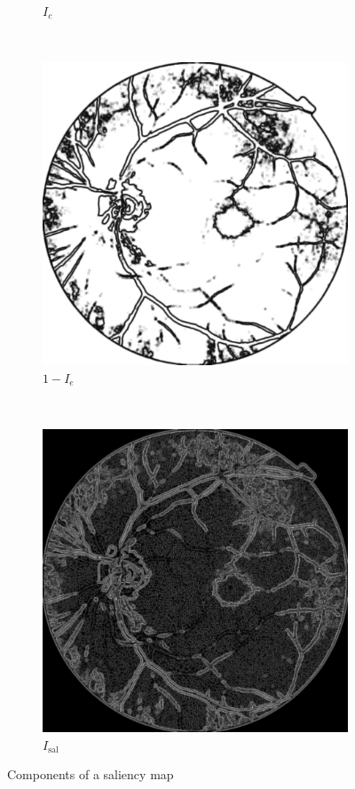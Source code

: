 \documentclass{scrartcl}
\begin{document}
\begin{figure}[htb]
\begin{subfigure}{0.25\textwidth}
    \caption{$I_c$}
\end{subfigure}~
\begin{subfigure}{0.25\textwidth}
\centering
    \includegraphics[width=1\textwidth]{saliency_entropy}
    \caption{$1 - I_e$}
\end{subfigure}~
\begin{subfigure}{0.25\textwidth}
\centering
    \includegraphics[width=1\textwidth]{saliency_full}
    \caption{$I_{\text{sal}}$}
\end{subfigure}

\caption{Components of a saliency map}
\label{fig:saliency}
\end{figure}
\end{document}
